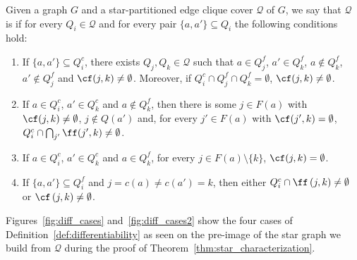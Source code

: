 \begin{definition}
    \label{def:differentiability}
    Given a graph $G$ and a star-partitioned edge clique cover $\mathcal{Q}$ of $G$, we say that $\mathcal{Q}$ is  if for every $Q_i \in \mathcal{Q}$ and for every pair $\{a, a'\} \subseteq Q_i$ the following conditions hold:
    \begin{enumerate}
        \item If $\{a, a'\} \subseteq Q_i^c$, there exists $Q_j, Q_k \in \mathcal{Q}$ such that $a \in Q_j^f$, $a' \in Q_k^f$, $a \notin Q_k^f$, $a' \notin Q_j^f$ and $\cf(j,k) \neq \emptyset$. Moreover, if $Q_i^c \cap Q_j^f \cap Q_k^f = \emptyset$, $\cf(j,k) \neq \emptyset$.
        \item If $a \in Q_i^c$, $a' \in Q_k^c$ and $a \notin Q_k^f$, then there is some $j \in F(a)$ with $\cf(j,k) \neq \emptyset$, $j \notin Q(a')$ and, for every $j' \in F(a)$ with $\cf(j',k) = \emptyset$, $Q_i^c \cap \bigcap_{j'} \ff(j',k) \neq \emptyset$.
        \item If $a \in Q_i^c$, $a' \in Q_k^c$ and $a \in Q_k^f$, for every $j \in F(a) \setminus \{k\}$, $\cf(j,k) = \emptyset$.
        \item If $\{a, a'\} \subseteq Q_i^f$ and $j = c(a) \neq c(a') = k$, then either $Q_i^c \cap \ff\left(j,k\right) \neq \emptyset$ or $\cf\left(j,k\right) \neq \emptyset$.
    \end{enumerate}
\end{definition}

Figures~\ref{fig:diff_cases} and~\ref{fig:diff_cases2} show the four cases of Definition~\ref{def:differentiability} as seen on the pre-image of the star graph we build from $\mathcal{Q}$ during the proof of Theorem~\ref{thm:star_characterization}.

